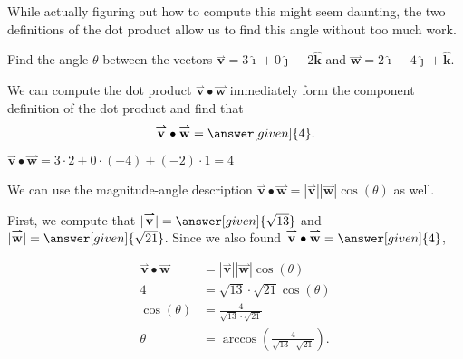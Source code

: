 \documentclass{ximera}
\begin{document}
While actually figuring out how to compute this might seem daunting, the two definitions of the dot product allow us to find this angle without too much work. 

\begin{example}
Find the angle $\theta$ between the vectors $\overset{\boldsymbol{\rightharpoonup}}{\mathbf{v}} = 3\boldsymbol{\hat{\imath}}+0\boldsymbol{\hat{\jmath}}-2\boldsymbol{\hat{k}}$ and $ \overset{\boldsymbol{\rightharpoonup}}{\mathbf{w}} = 2\boldsymbol{\hat{\imath}}-4\boldsymbol{\hat{\jmath}}+\boldsymbol{\hat{k}}$.

\begin{explanation}
We can compute the dot product $\overset{\boldsymbol{\rightharpoonup}}{\mathbf{v}} \bullet \overset{\boldsymbol{\rightharpoonup}}{\mathbf{w}}$ immediately form the component definition of the dot product and find that 
\[
\overset{\boldsymbol{\rightharpoonup}}{\mathbf{v}} \bullet \overset{\boldsymbol{\rightharpoonup}}{\mathbf{w}} = \answer[given]{4}.
\]
\begin{hint}
$\overset{\boldsymbol{\rightharpoonup}}{\mathbf{v}} \bullet \overset{\boldsymbol{\rightharpoonup}}{\mathbf{w}} = 3\cdot2+0\cdot (-4) + (-2) \cdot 1 =4$
\end{hint}
We can use the magnitude-angle description $\overset{\boldsymbol{\rightharpoonup}}{\mathbf{v}} \bullet \overset{\boldsymbol{\rightharpoonup}}{\mathbf{w}} = |\overset{\boldsymbol{\rightharpoonup}}{\mathbf{v}}||\overset{\boldsymbol{\rightharpoonup}}{\mathbf{w}}|\cos(\theta)$ as well.

First, we compute that $|\overset{\boldsymbol{\rightharpoonup}}{\mathbf{v}}| = \answer[given]{\sqrt{13}}$ and $|\overset{\boldsymbol{\rightharpoonup}}{\mathbf{w}}| = \answer[given]{\sqrt{21}}$.  Since we also found $\overset{\boldsymbol{\rightharpoonup}}{\mathbf{v}} \bullet \overset{\boldsymbol{\rightharpoonup}}{\mathbf{w}} = \answer[given]{4}$, 

\begin{align*}
\overset{\boldsymbol{\rightharpoonup}}{\mathbf{v}} \bullet \overset{\boldsymbol{\rightharpoonup}}{\mathbf{w}} &= |\overset{\boldsymbol{\rightharpoonup}}{\mathbf{v}}||\overset{\boldsymbol{\rightharpoonup}}{\mathbf{w}}|\cos(\theta) \\
4 &= \sqrt{13} \cdot \sqrt{21} \cos(\theta) \\
\cos(\theta) &= \frac{4}{\sqrt{13} \cdot \sqrt{21}} \\
\theta ~ &= \arccos\left(\frac{4}{\sqrt{13} \cdot \sqrt{21}} \right).
\end{align*}

\end{explanation}
\end{example}
\end{document}
